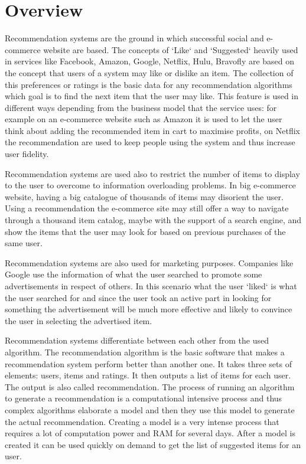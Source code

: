 \chapter{Overview}
\label{chapter:<overview>}

\acresetall

Recommendation systems are the ground in which successful social and e-commerce website are based. The concepts of `Like` and `Suggested` heavily used in services like Facebook, Amazon, Google, Netflix, Hulu, Bravofly are based on the concept that users of a system may like or dislike an item. The collection of this preferences or ratings is the basic data for any recommendation algorithms which goal is to find the next item that the user may like. This feature is used in different ways depending from the business model that the service uses: for example on an e-commerce website such as Amazon it is used to let the user think about adding the recommended item in cart to maximise profits, on Netflix the recommendation are used to keep people using the system and thus increase user fidelity.

Recommendation systems are used also to restrict the number of items to display to the user to overcome to information overloading problems. In big e-commerce website, having a big catalogue of thousands of items may disorient the user. Using a recommendation the e-commerce site may still offer a way to navigate through a thousand item catalog, maybe with the support of a search engine, and show the items that the user may look for based on previous purchases of the same user.

Recommendation systems are also used for marketing purposes. Companies like Google use the information of what the user searched to promote some advertisements in respect of others. In this scenario what the user `liked` is what the user searched for and since the user took an active part in looking for something the advertisement will be much more effective and likely to convince the user in selecting the advertised item.

Recommendation systems differentiate between each other from the used algorithm. The recommendation algorithm is the basic software that makes a recommendation system perform better than another one. It takes three sets of elements: users, items and ratings. It then outputs a list of items for each user. The output is also called recommendation. The process of running an algorithm to generate a recommendation is a computational intensive process and thus complex algorithms elaborate a model and then they use this model to generate the actual recommendation. Creating a model is a very intense process that requires a lot of computation power and \ac{RAM} for several days. After a model is created it can be used quickly on demand to get the list of suggested items for an user.

